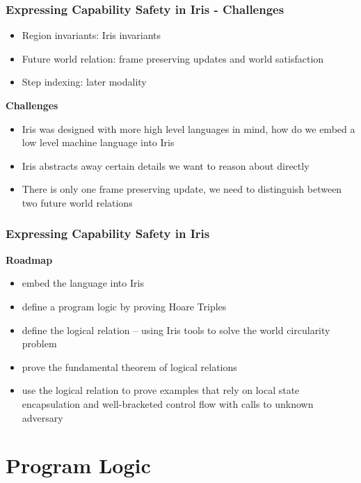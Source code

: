 \documentclass{beamer}
\begin{document}
\begin{frame}
\frametitle{Expressing Capability Safety in Iris - Challenges}

\begin{itemize}
	\item Region invariants: Iris invariants
	\item Future world relation: frame preserving updates and world satisfaction 
	\item Step indexing: later modality
\end{itemize}

\textbf{Challenges}
\begin{itemize}
	\item<2-> Iris was designed with more high level languages in mind, how do we embed a low level machine language into Iris
	\item<3-> Iris abstracts away certain details we want to reason about directly
	\item<4-> There is only one frame preserving update, we need to distinguish between two future world relations
\end{itemize}

\end{frame}

\begin{frame}
\frametitle{Expressing Capability Safety in Iris}

\textbf{Roadmap}
	\begin{itemize}
		\item<2> embed the language into Iris
		\item<3> define a program logic by proving Hoare Triples
		\item<4> define the logical relation -- using Iris tools to solve the world circularity problem
		\item<5> prove the fundamental theorem of logical relations
		\item<6> use the logical relation to prove examples that rely on local state encapsulation and well-bracketed control flow with calls to unknown adversary
	\end{itemize}

\end{frame}


\section{Program Logic}
\end{document}
